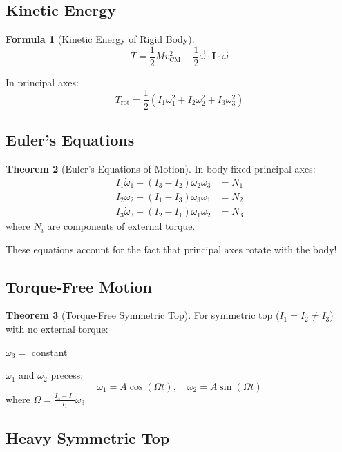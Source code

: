 \documentclass[12pt,a4paper]{article}
\theoremstyle{definition}
\newtheorem{theorem}{Theorem}[section]
\newtheorem{formula}[theorem]{Formula}
\begin{document}
\subsection{Kinetic Energy}

\begin{formula}[Kinetic Energy of Rigid Body]
\[
T = \frac{1}{2}M v_{\text{CM}}^2 + \frac{1}{2}\vec{\omega} \cdot \mathbf{I} \cdot \vec{\omega}
\]

In principal axes:
\[
T_{\text{rot}} = \frac{1}{2}(I_1\omega_1^2 + I_2\omega_2^2 + I_3\omega_3^2)
\]
\end{formula}

\subsection{Euler's Equations}

\begin{theorem}[Euler's Equations of Motion]
In body-fixed principal axes:
\begin{align}
I_1\dot{\omega}_1 + (I_3 - I_2)\omega_2\omega_3 &= N_1 \\
I_2\dot{\omega}_2 + (I_1 - I_3)\omega_3\omega_1 &= N_2 \\
I_3\dot{\omega}_3 + (I_2 - I_1)\omega_1\omega_2 &= N_3
\end{align}
where $N_i$ are components of external torque.
\end{theorem}

\begin{tipbox}
These equations account for the fact that principal axes rotate with the body!
\end{tipbox}

\subsection{Torque-Free Motion}

\begin{theorem}[Torque-Free Symmetric Top]
For symmetric top ($I_1 = I_2 \neq I_3$) with no external torque:

$\omega_3 = $ constant

$\omega_1$ and $\omega_2$ precess:
\[
\omega_1 = A\cos(\Omega t), \quad \omega_2 = A\sin(\Omega t)
\]
where $\Omega = \frac{I_3 - I_1}{I_1}\omega_3$
\end{theorem}

\subsection{Heavy Symmetric Top}
\end{document}
